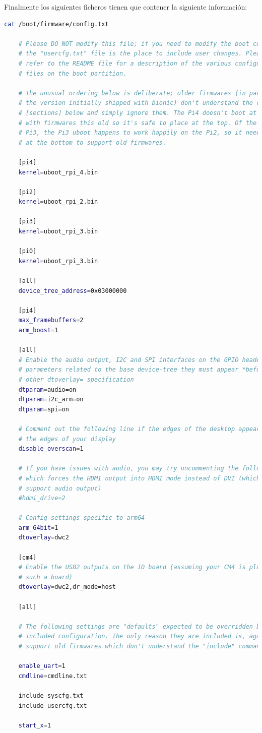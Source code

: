 Finalmente los siguientes ficheros tienen que contener la siguiente información: 


\begin{lstlisting}[language=bash]
	cat /boot/firmware/config.txt 
	
	# Please DO NOT modify this file; if you need to modify the boot config,
	# the "usercfg.txt" file is the place to include user changes. Please 
	# refer to the README file for a description of the various configuration 
	# files on the boot partition.
	
	# The unusual ordering below is deliberate; older firmwares (in particular 
	# the version initially shipped with bionic) don't understand the conditional
	# [sections] below and simply ignore them. The Pi4 doesn't boot at all 
	# with firmwares this old so it's safe to place at the top. Of the Pi2 and 
	# Pi3, the Pi3 uboot happens to work happily on the Pi2, so it needs to go 
	# at the bottom to support old firmwares.
	
	[pi4]
	kernel=uboot_rpi_4.bin
	
	[pi2]
	kernel=uboot_rpi_2.bin
	
	[pi3]
	kernel=uboot_rpi_3.bin
	
	[pi0]
	kernel=uboot_rpi_3.bin
	
	[all]
	device_tree_address=0x03000000
	
	[pi4]
	max_framebuffers=2
	arm_boost=1
	
	[all]
	# Enable the audio output, I2C and SPI interfaces on the GPIO header. As these
	# parameters related to the base device-tree they must appear *before* any
	# other dtoverlay= specification
	dtparam=audio=on
	dtparam=i2c_arm=on
	dtparam=spi=on
	
	# Comment out the following line if the edges of the desktop appear outside
	# the edges of your display
	disable_overscan=1
	
	# If you have issues with audio, you may try uncommenting the following line
	# which forces the HDMI output into HDMI mode instead of DVI (which doesn't
	# support audio output)
	#hdmi_drive=2
	
	# Config settings specific to arm64
	arm_64bit=1
	dtoverlay=dwc2
	
	[cm4]
	# Enable the USB2 outputs on the IO board (assuming your CM4 is plugged into
	# such a board)
	dtoverlay=dwc2,dr_mode=host
	
	[all]
	
	# The following settings are "defaults" expected to be overridden by the
	# included configuration. The only reason they are included is, again, to
	# support old firmwares which don't understand the "include" command.
	
	enable_uart=1
	cmdline=cmdline.txt
	
	include syscfg.txt
	include usercfg.txt
	
	start_x=1
\end{lstlisting}

